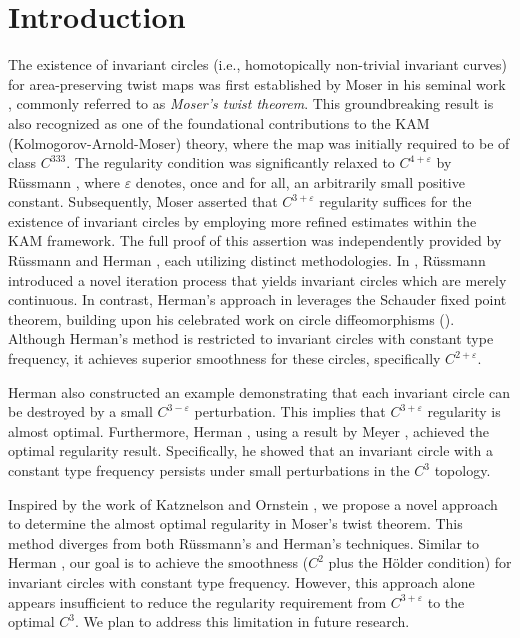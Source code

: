 \documentclass{amsart}
\theoremstyle{definition}
\begin{document}
\section{Introduction}
The existence of invariant circles (i.e., homotopically non-trivial invariant curves) for area-preserving twist maps was first established by Moser in his seminal work \cite{Mo1}, commonly referred to as \emph{Moser's twist theorem}. This groundbreaking result is also recognized as one of the foundational contributions to the KAM (Kolmogorov-Arnold-Moser) theory, where the map was initially required to be of class \( C^{333} \). The regularity condition was significantly relaxed to \( C^{4+\varepsilon} \) by R\"{u}ssmann \cite{R1}, where $\varepsilon$ denotes, once and for all, an arbitrarily small positive constant. Subsequently, Moser \cite[Page 53]{Mo2} asserted that \( C^{3+\varepsilon} \) regularity suffices for the existence of invariant circles by employing more refined estimates within the KAM framework. The full proof of this assertion was independently provided by R\"{u}ssmann \cite{R2} and Herman \cite{H1}, each utilizing distinct methodologies. In \cite{R2}, R\"{u}ssmann introduced a novel iteration process that yields invariant circles which are merely continuous. In contrast, Herman's approach in \cite{H1} leverages the Schauder fixed point theorem, building upon his celebrated work on circle diffeomorphisms (\cite{H11}). Although Herman's method is restricted to invariant circles with constant type frequency, it achieves superior smoothness for these circles, specifically \( C^{2+\varepsilon} \).



Herman \cite{H1} also constructed an example demonstrating that each invariant circle can be destroyed by a small $C^{3-\varepsilon}$ perturbation. This implies that $C^{3+\varepsilon}$ regularity is almost optimal. Furthermore, Herman \cite{H33}, using a result by Meyer \cite{Me}, achieved the optimal regularity result. Specifically, he showed that an invariant circle with a constant type frequency persists under small perturbations in the $C^{3}$ topology.




Inspired by the work of Katznelson and Ornstein \cite{KO1}, we propose a novel approach to determine the almost optimal regularity in Moser's twist theorem. This method diverges from both R\"{u}ssmann's and Herman's techniques. Similar to Herman \cite{H1}, our goal is to achieve the smoothness ($C^2$ plus the H\"{o}lder condition) for invariant circles with constant type frequency. However, this approach alone appears insufficient to reduce the regularity requirement from \( C^{3+\varepsilon} \) to the optimal \( C^{3} \). We plan to address this limitation in future research.
\end{document}
